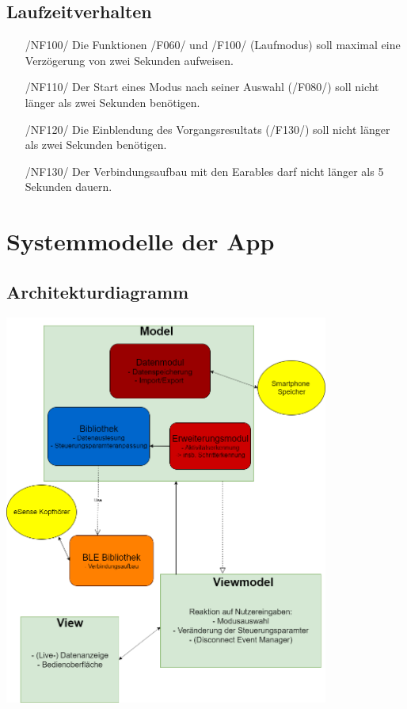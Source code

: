 \documentclass[a4paper,12pt]{article}
\begin{document}
\subsection{Laufzeitverhalten}
\begin{itemize}
  \item[/NF100/] Die Funktionen /F060/ und /F100/ (Laufmodus) soll maximal eine Verzögerung von zwei Sekunden aufweisen. %
  \item[/NF110/] Der Start eines Modus nach seiner Auswahl (/F080/) soll nicht länger als zwei Sekunden benötigen. %
  \item[/NF120/] Die Einblendung des Vorgangsresultats (/F130/) soll nicht länger als zwei Sekunden benötigen.%
  \item[/NF130/] Der Verbindungsaufbau mit den \Gls{Earables} darf nicht länger als 5 Sekunden dauern.

\end{itemize}
\section{Systemmodelle der App}
  \subsection{Architekturdiagramm}
  \begin{center}
  	\vspace{100px}
  	\includegraphics[width=0.8\textwidth]{./Diagramme/Archi3.png}
  \end{center}
  \clearpage %
\end{document}

